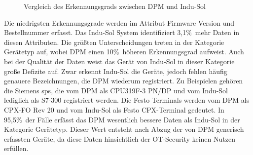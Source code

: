 \bigskip
\begin{figure}[ht]
    \centering
    \caption{Vergleich des Erkennungsgrads zwischen DPM und Indu-Sol}
    \label{fig:vergleich}
\end{figure}
\bigskip 

\noindent Die niedrigsten Erkennungsgrade werden im Attribut Firmware Version und Bestellnummer erfasst. Das Indu-Sol System identifiziert 3,1\%\ mehr Daten in diesen Attributen. Die größten Unterscheidungen treten in der Kategorie Gerätetyp auf, wobei DPM einen 10\%\ höheren Erkennungsgrad aufweist. Auch bei der Qualität der Daten weist das Gerät von Indu-Sol in dieser Kategorie große Defizite auf. Zwar erkennt Indu-Sol die Geräte, jedoch fehlen häufig genauere Bezeichnungen, die DPM wiederum registriert. Zu Beispielen gehören die Siemens \ac{sps}, die vom DPM als CPU319F-3 PN/DP und vom Indu-Sol lediglich als S7-300 registriert werden. Die Festo Terminals werden vom DPM als CPX-FO Rev 20 und vom Indu-Sol als Festo CPX-Terminal gedeutet. \clearpage \noindent In 95,5\%\ der Fälle erfässt das DPM wesentlich bessere Daten als Indu-Sol in der Kategorie Gerätetyp. Dieser Wert entsteht nach Abzug der von DPM generisch erfassten Geräte, da diese Daten hinsichtlich der OT-Security keinen Nutzen erfüllen. 
\bigskip

